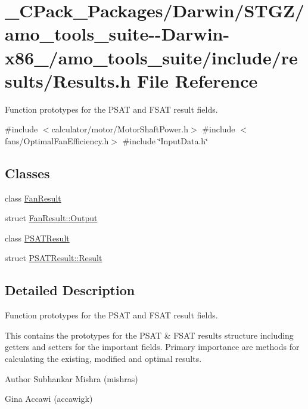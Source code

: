 \hypertarget{___c_pack___packages_2_darwin_2_s_t_g_z_2amo__tools__suite--_darwin-x86__64_2amo__tools__suite_2include_2results_2_results_8h}{}\section{\+\_\+\+C\+Pack\+\_\+\+Packages/\+Darwin/\+S\+T\+G\+Z/amo\+\_\+tools\+\_\+suite-\/-\/\+Darwin-\/x86\+\_/amo\+\_\+tools\+\_\+suite/include/results/\+Results.h File Reference}
\label{___c_pack___packages_2_darwin_2_s_t_g_z_2amo__tools__suite--_darwin-x86__64_2amo__tools__suite_2include_2results_2_results_8h}


Function prototypes for the P\+S\+AT and F\+S\+AT result fields.  


{\ttfamily \#include $<$calculator/motor/\+Motor\+Shaft\+Power.\+h$>$}\newline
{\ttfamily \#include $<$fans/\+Optimal\+Fan\+Efficiency.\+h$>$}\newline
{\ttfamily \#include \char`\"{}Input\+Data.\+h\char`\"{}}\newline
\subsection*{Classes}
\begin{DoxyCompactItemize}
\item 
class \hyperlink{class_fan_result}{Fan\+Result}
\item 
struct \hyperlink{struct_fan_result_1_1_output}{Fan\+Result\+::\+Output}
\item 
class \hyperlink{class_p_s_a_t_result}{P\+S\+A\+T\+Result}
\item 
struct \hyperlink{struct_p_s_a_t_result_1_1_result}{P\+S\+A\+T\+Result\+::\+Result}
\end{DoxyCompactItemize}


\subsection{Detailed Description}
Function prototypes for the P\+S\+AT and F\+S\+AT result fields. 

This contains the prototypes for the P\+S\+AT \& F\+S\+AT results structure including getters and setters for the important fields. Primary importance are methods for calculating the existing, modified and optimal results.

\begin{DoxyAuthor}{Author}
Subhankar Mishra (mishras) 

Gina Accawi (accawigk) 
\end{DoxyAuthor}
